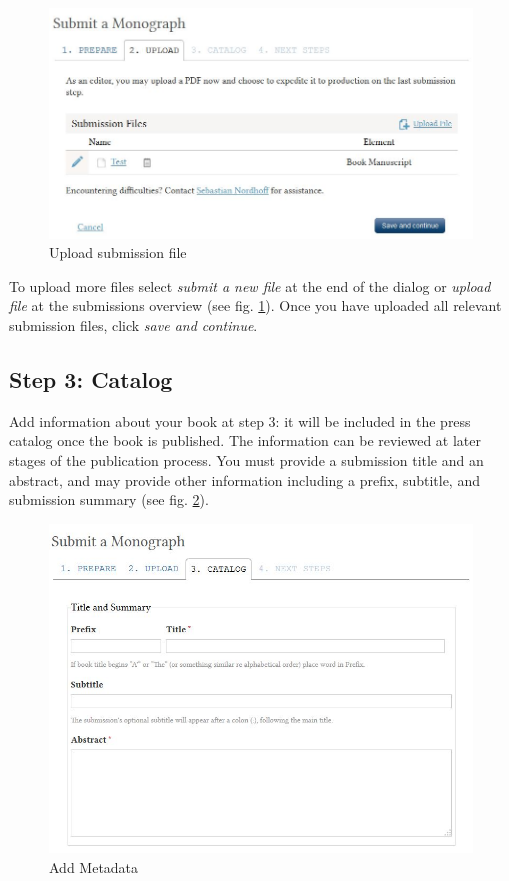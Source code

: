 \begin{figure}[h] \centering 
\includegraphics[width=1\textwidth]{./img/submission-5.jpg} 
\caption{Upload submission file}
\label{fig:submission5}
\end{figure}

To upload more files select \textit{submit a new file} at the end of the dialog or \textit{upload file} at the submissions overview (see fig. \ref{fig:submission5}). Once you have uploaded all relevant submission files, click \textit{save and continue}.

\newpage

\subsection*{Step 3: Catalog}

Add information about your book at step 3: it will be included in the press catalog once the book is published. The information can be reviewed at later stages of the publication process. You must provide a submission title and an abstract, and may provide other information including a prefix, subtitle, and submission summary (see fig. \ref{fig:submission6}).

\begin{figure}[h] \centering 
\includegraphics[width=1\textwidth]{./img/submission-6.jpg} \caption{Add Metadata}
\label{fig:submission6}

\end{figure}

